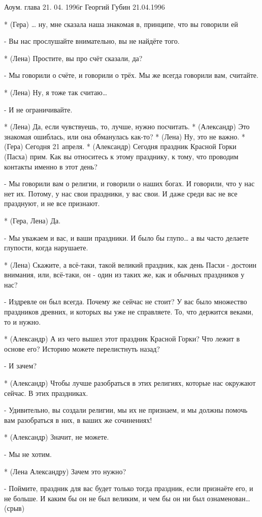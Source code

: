 Аоум. глава 21. 04. 1996г
Георгий Губин
  21.04.1996 

* (Гера) … ну, мне сказала наша знакомая в, принципе, что вы говорили ей

-  Вы нас прослушайте внимательно, вы не найдёте того.

* (Лена) Простите, вы про счёт сказали, да?

-  Мы говорили о счёте, и говорили о трёх. Мы же всегда говорили вам, считайте.

* (Лена) Ну, я тоже так считаю…

-  И не ограничивайте.

* (Лена) Да, если чувствуешь, то, лучше, нужно посчитать.
* (Александр) Это знакомая ошиблась, или она обманулась как-то? 
* (Лена) Ну, это не важно.
* (Гера) Сегодня 21 апреля.
* (Александр) Сегодня праздник Красной Горки (Пасха) прим. Как вы относитесь к этому празднику, к тому, что проводим контакты именно в этот день?

- Мы говорили вам о религии, и говорили о наших богах. И говорили, что у нас нет их. Потому, у нас свои праздники, у вас свои. И даже среди вас не все празднуют, и не все признают.

* (Гера, Лена) Да. 

- Мы уважаем и вас, и ваши праздники. И было бы глупо… а вы часто делаете глупости, когда нарушаете.

* (Лена) Скажите, а всё-таки, такой великий праздник, как день Пасхи - достоин внимания, или, всё-таки, он - один из таких же, как и обычных праздников у нас?

- Издревле он был всегда. Почему же сейчас не стоит? У вас было множество праздников древних, и которых вы уже не справляете. То, что держится веками, то и нужно.

* (Александр) А из чего вышел этот праздник Красной Горки? Что лежит в основе его? Историю можете перелистнуть назад?

- И зачем?

* (Александр) Чтобы лучше разобраться в этих религиях, которые нас окружают сейчас. В этих праздниках.

- Удивительно, вы создали религии, мы их не признаем, и мы должны помочь вам разобраться в них, в ваших же сочинениях!

* (Александр) Значит, не можете.

- Мы не хотим. 

* (Лена Александру) Зачем это нужно?

-  Поймите, праздник для вас будет только тогда праздник, если признаёте его, и не больше. И каким бы он не был великим, и чем бы он ни был ознаменован…(срыв)


